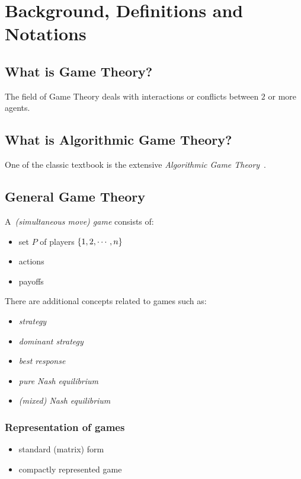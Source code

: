 \chapter{Background, Definitions and Notations}

\section{What is Game Theory?}

The field of Game Theory deals with interactions or conflicts between $2$ or more agents.
\todo

\section{What is Algorithmic Game Theory?}
One of the classic textbook is the extensive \emph{Algorithmic Game Theory}~\cite{AGT07}.
\todo

\section{General Game Theory}

A~\emph{(simultaneous move) game} consists of: \todo
\begin{itemize}
  \item set $P$ of players $\left\{ 1, 2, \cdots, n \right\}$
  \item actions
  \item payoffs
\end{itemize}

There are additional concepts related to games such as: \todo
\begin{itemize}
  \item \emph{strategy}
  \item \emph{dominant strategy}
  \item \emph{best response}
  \item \emph{pure Nash equilibrium}
  \item \emph{(mixed) Nash equilibrium}
\end{itemize}

\subsection{Representation of games}

\todo
\begin{itemize}
  \item standard (matrix) form
  \item compactly represented game
\end{itemize}


